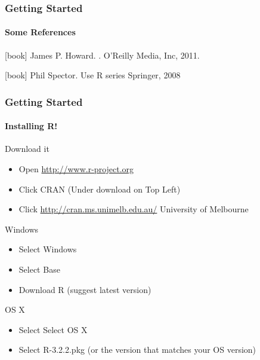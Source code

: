 \documentclass[10pt,handout,english]{beamer}\usepackage[]{graphicx}\usepackage[]{color}
\begin{document}
\begin{frame}%
\frametitle{Getting Started}
  \framesubtitle{Some References}
  \begin{thebibliography}{10}    
  [book]
    James P. Howard.
    .
    \newblock O'Reilly Media, Inc, 2011.
 
  [book]
    Phil Spector.
    \newblock Use R series 
    \newblock Springer, 2008
    
  \end{thebibliography}
\end{frame}


\begin{frame}
  \frametitle{Getting Started}
  \framesubtitle{Installing R!}

  \begin{block}{Download it}
  \begin{itemize}
    \item Open \url{http://www.r-project.org}
    \item Click CRAN (Under download on Top Left)
    \item Click \url{http://cran.ms.unimelb.edu.au/} University of Melbourne
  \end{itemize}
  \end{block}

  \begin{block}{Windows}
  \begin{itemize}
    \item Select Windows
    \item Select Base
    \item Download R (suggest latest version)
  \end{itemize}
  \end{block}

  \begin{block}{OS X}
  \begin{itemize}
    \item Select Select OS X
    \item Select R-3.2.2.pkg (or the version that matches your OS version)
  \end{itemize}
  \end{block}

\end{frame}
\end{document}
